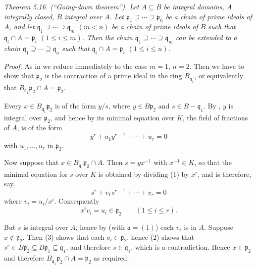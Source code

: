 
\noindent\textit{Theorem 5.16. (``Going-down theorem''). Let $A\subseteq B$ be integral domains, $A$ integrally closed, $B$ integral over $A$. Let $\mathfrak p_1\supseteq\cdots\supseteq\mathfrak p_n$ be a chain of prime ideals of $A$, and let $\mathfrak q_1\supseteq\cdots\supseteq\mathfrak q_m$ $(m<n)$ be a chain of prime ideals of $B$ such that $\mathfrak q_i\cap A=\mathfrak p_i$ $(1\leq i\leq m)$. Then the chain $\mathfrak q_1\supseteq\cdots\supseteq\mathfrak q_m$ can be extended to a chain $\mathfrak q_1\supseteq\cdots\supseteq\mathfrak q_n$ such that $\mathfrak q_i\cap A=\mathfrak p_i$ $(1\leq i\leq n)$.}

\noindent\textit{Proof.} As in  we reduce immediately to the case $m=1$, $n=2$. Then we have to show that $\mathfrak p_2$ is the contraction of a prime ideal in the ring $B_{\mathfrak q_1}$, or equivalently  that $B_{\mathfrak q_1}\mathfrak p_2\cap A=\mathfrak p_2$.

Every $x\in B_{\mathfrak q_1}\mathfrak p_2$ is of the form $y/s$, where $y\in B\mathfrak p_2$ and $s\in B-\mathfrak q_1$. By , $y$ is integral over $\mathfrak p_2$, and hence by  its minimal equation over $K$, the field of fractions of $A$, is of the form
\begin{equation}
 y^r+u_1y^{r-1}+\cdots+u_r=0
 \tag{1}
\end{equation}
with $u_1,\ldots,u_r$ in $\mathfrak p_2$.

Now suppose that $x\in B_{\mathfrak q_1}\mathfrak p_2\cap A$. Then $s=yx^{-1}$ with $x^{-1}\in K$, so that the minimal equation for $s$ over $K$ is obtained by dividing (1) by $x^r$, and is therefore, say,
\begin{equation}
 s^r+v_1s^{r-1}+\cdots+v_r=0
 \tag{2}
\end{equation}
where $v_i=u_i/x^i$. Consequently
\begin{equation}
 x^iv_i=u_i\in\mathfrak p_2\qquad(1\leq i\leq r).
 \tag{3}
\end{equation}

But $s$ is integral over $A$, hence by  (with $\mathfrak a=(1)$) each $v_i$ is in $A$. Suppose $x\notin\mathfrak p_2$. Then (3) shows that each $v_i\in\mathfrak p_2$, hence (2) shows that $s^r\in B\mathfrak p_2\subseteq B\mathfrak p_1\subseteq\mathfrak q_1$, and therefore $s\in\mathfrak q_1$, which is a contradiction. Hence $x\in\mathfrak p_2$ and therefore $B_{\mathfrak q_1}\mathfrak p_2\cap A=\mathfrak p_2$ as required. \proofbox

